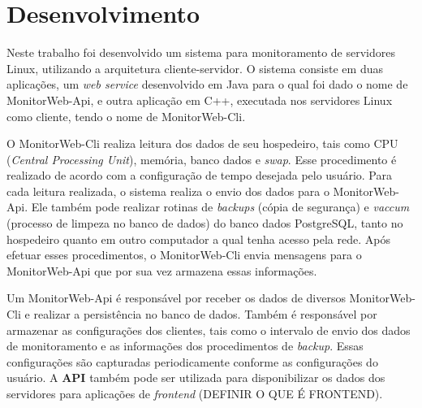 
\chapter{Desenvolvimento}\label{cap:Desenvolvimento}

Neste trabalho foi desenvolvido um sistema para monitoramento de servidores Linux, utilizando a arquitetura cliente-servidor.
O sistema consiste em duas aplicações, um \textit{web service} desenvolvido em Java para o qual foi dado o nome de MonitorWeb-Api, e outra aplicação em C++, executada nos servidores Linux como cliente, tendo o nome de MonitorWeb-Cli.

O MonitorWeb-Cli realiza leitura dos dados de seu hospedeiro, tais como CPU (\textit{Central Processing Unit}), memória, banco dados e \textit{swap}. Esse procedimento é realizado de acordo com a configuração de tempo desejada pelo usuário. Para cada leitura realizada, o sistema realiza o envio dos dados para o MonitorWeb-Api. Ele também pode realizar rotinas de \textit{backups} (cópia de segurança) e \textit{vaccum} (processo de limpeza no banco de dados) do banco dados PostgreSQL, tanto no hospedeiro quanto em outro computador a qual tenha acesso pela rede. Após efetuar esses procedimentos, o MonitorWeb-Cli envia mensagens para o MonitorWeb-Api que por sua vez armazena essas informações.

Um MonitorWeb-Api é responsável por receber os dados de diversos MonitorWeb-Cli e realizar a persistência no banco de dados. Também é responsável por armazenar as configurações dos clientes, tais como o intervalo de envio dos dados de monitoramento e as informações dos procedimentos de \textit{backup}. Essas configurações são capturadas periodicamente conforme as configurações do usuário. A \textbf{API} também pode ser utilizada para disponibilizar os dados dos servidores para aplicações de \textit{frontend} (DEFINIR O QUE É FRONTEND).


